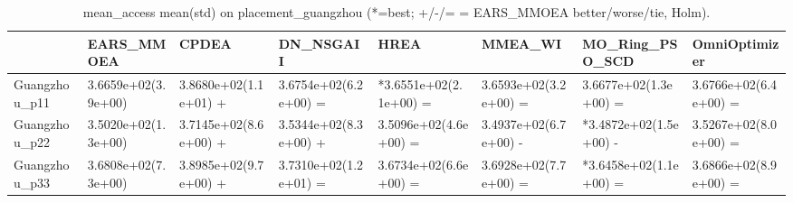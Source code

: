 \begin{table}[t]
\centering
\caption{mean_access mean(std) on placement_guangzhou (*=best; +/-/= = EARS_MMOEA better/worse/tie, Holm).}
\label{tab:placement_guangzhou_mean_access}
\begin{tabular}{llllllll}
\toprule
 & EARS\_MMOEA & CPDEA & DN\_NSGAII & HREA & MMEA\_WI & MO\_Ring\_PSO\_SCD & OmniOptimizer \\
\midrule
Guangzhou\_p11 & 3.6659e+02(3.9e+00) & 3.8680e+02(1.1e+01) + & 3.6754e+02(6.2e+00) = & *3.6551e+02(2.1e+00) = & 3.6593e+02(3.2e+00) = & 3.6677e+02(1.3e+00) = & 3.6766e+02(6.4e+00) = \\
Guangzhou\_p22 & 3.5020e+02(1.3e+00) & 3.7145e+02(8.6e+00) + & 3.5344e+02(8.3e+00) + & 3.5096e+02(4.6e+00) = & 3.4937e+02(6.7e+00) - & *3.4872e+02(1.5e+00) - & 3.5267e+02(8.0e+00) = \\
Guangzhou\_p33 & 3.6808e+02(7.3e+00) & 3.8985e+02(9.7e+00) + & 3.7310e+02(1.2e+01) = & 3.6734e+02(6.6e+00) = & 3.6928e+02(7.7e+00) = & *3.6458e+02(1.1e+00) = & 3.6866e+02(8.9e+00) = \\
\bottomrule
\end{tabular}
\end{table}
